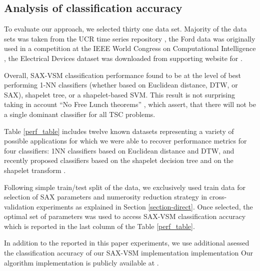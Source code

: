 \documentclass{llncs}
\begin{document}
\subsection{Analysis of classification accuracy}
To evaluate our approach, we selected thirty one data set. Majority of the data sets was taken 
from the UCR time series repository \cite{ucr}, the Ford data was originally used in a competition
at the IEEE World Congress on Computational Intelligence \cite{ford}, the Electrical Devices
dataset was downloaded from supporting website for \cite{bagnal}.

Overall, SAX-VSM classification performance found to be at the level of best
performing 1-NN classifiers (whether based on Euclidean distance, DTW, or SAX), shapelet tree, or a
shapelet-based SVM. This result is not surprising taking in account ``No Free Lunch theorems''
\cite{nfl}, which assert, that there will not be a single dominant classifier for all TSC problems.

Table \ref{perf_table} includes twelve known datasets representing a variety of possible 
applications for which we were able to recover performance metrics for four classifiers:
1NN classifiers based on Euclidean distance and DTW, and recently proposed classifiers 
based on the shapelet decision tree \cite{shapelet} \cite{logical} and on the 
shapelet transform \cite{bagnal}. 

Following simple train/test split of the data, we exclusively used train data for selection
of SAX parameters and numerosity reduction strategy in cross-validation experiments as 
explained in Section \ref{section-direct}. Once selected, the optimal set of parameters 
was used to access SAX-VSM classification accuracy which is reported in the last column 
of the Table \ref{perf_table}.

In addition to the reported in this paper experiments, we use additional asessed the classification
accuracy 
of our SAX-VSM implementation implementation 
Our algorithm implementation is publicly available at \cite{jmotif}.
\end{document}
